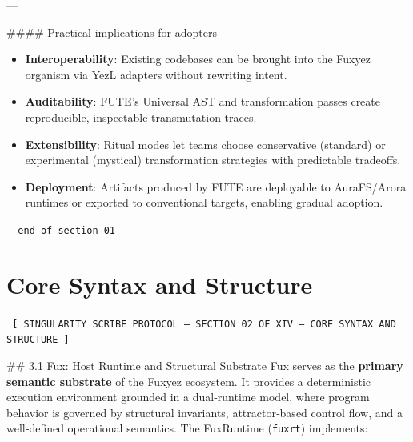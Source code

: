 ---

\#\#\#\# Practical implications for adopters
\begin{itemize}
  \item \textbf{Interoperability}: Existing codebases can be brought into the Fuxyez organism via YezL adapters without rewriting intent.  
  \item \textbf{Auditability}: FUTE’s Universal AST and transformation passes create reproducible, inspectable transmutation traces.  
  \item \textbf{Extensibility}: Ritual modes let teams choose conservative (standard) or experimental (mystical) transformation strategies with predictable tradeoffs.  
  \item \textbf{Deployment}: Artifacts produced by FUTE are deployable to AuraFS/Arora runtimes or exported to conventional targets, enabling gradual adoption.
\end{itemize}
    
    \vspace{1cm}
    \begin{center}
    \color{alienPurple}\texttt{--- end of section 01 ---}
    \end{center}
    \clearpage
    

    \chapter*{Core Syntax and Structure}
    
    
    \begin{glyphbox}
    \centering
    \color{neonCyan}\fontsize{8}{10}\selectfont\texttt{
    [ SINGULARITY SCRIBE PROTOCOL -- SECTION 02 OF XIV -- CORE SYNTAX AND STRUCTURE ]
    }
    \end{glyphbox}
    \vspace{0.3cm}
    
    
    \#\# 3.1 Fux: Host Runtime and Structural Substrate  
Fux serves as the \textbf{primary semantic substrate} of the Fuxyez ecosystem. It provides a deterministic execution environment grounded in a dual‑runtime model, where program behavior is governed by structural invariants, attractor‑based control flow, and a well‑defined operational semantics. The FuxRuntime (\texttt{fuxrt}) implements:

